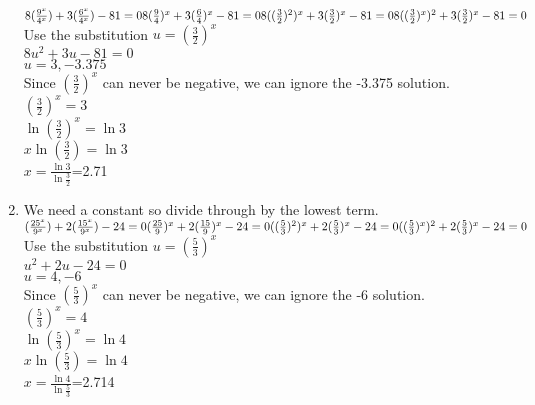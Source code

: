 \documentclass[../main.tex]{subfiles}
\begin{document}
\begin{spacing}{1.5}
\begin{enumerate}
    \(
    8(\frac{9^x}{4^x})+3(\frac{6^x}{4^x})-81=0\\
    8(\frac{9}{4})^x+3(\frac{6}{4})^x-81=0\\
    8((\frac{3}{2})^2)^x+3(\frac{3}{2})^x-81=0\\
    8((\frac{3}{2})^x)^2+3(\frac{3}{2})^x-81=0\\
    \)
    Use the substitution \(u=(\frac{3}{2})^x\)\\
    \(8u^2+3u-81=0\)\\
    \(u=3,-3.375\)\\
    Since \((\frac{3}{2})^x\) can never be negative, we can ignore the -3.375 solution.\\
    \((\frac{3}{2})^x=3\)\\
    \(\ln{(\frac{3}{2})^x}=\ln{3}\)\\
    \(x\ln{(\frac{3}{2})}=\ln{3}\)\\
    \(x=\frac{\ln{3}}{\ln{\frac{3}{2}}}\)=2.71
    \item 
    We need a constant so divide through by the lowest term.\\
    \(
    (\frac{25^x}{9^x})+2(\frac{15^x}{9^x})-24=0\\
    (\frac{25}{9})^x+2(\frac{15}{9})^x-24=0\\
    ((\frac{5}{3})^2)^x+2(\frac{5}{3})^x-24=0\\
    ((\frac{5}{3})^x)^2+2(\frac{5}{3})^x-24=0\\
    \)
    Use the substitution \(u=(\frac{5}{3})^x\)\\
    \(u^2+2u-24=0\)\\
    \(u=4,-6\)\\
    Since \((\frac{5}{3})^x\) can never be negative, we can ignore the -6 solution.\\
    \((\frac{5}{3})^x=4\)\\
    \(\ln{(\frac{5}{3})^x}=\ln{4}\)\\
    \(x\ln{(\frac{5}{3})}=\ln{4}\)\\
    \(x=\frac{\ln{4}}{\ln{\frac{5}{3}}}\)=2.714
\end{enumerate}


\end{spacing}
\end{document}
